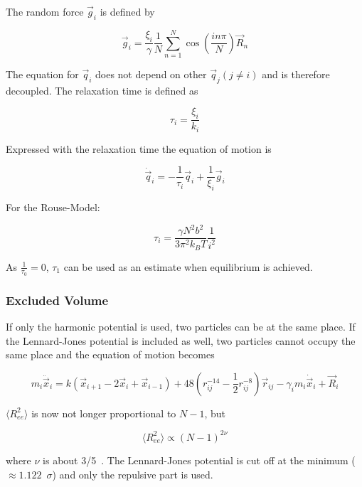 \documentclass[a4paper]{article}
\begin{document}
The random force $\vec{g}_i$ is defined by

\begin{equation}
\vec{g}_i = \frac{\xi_i}{\gamma} \frac{1}{N} \sum_{n=1}^N \cos \left( \frac{i n \pi}{N} \right) \vec{R}_n
\end{equation}

The equation for $\vec{q}_i$ does not depend on other $\vec{q}_j (j \neq i)$ and is therefore decoupled. The relaxation time is defined as

\begin{equation}
\tau_i = \frac{\xi_i}{k_i}
\end{equation}

Expressed with the relaxation time the equation of motion is

\begin{equation}
\dot{\vec{q}}_i = - \frac{1}{\tau_i} \vec{q}_i + \frac{1}{\xi_i} \vec{g}_i
\end{equation}

For the Rouse-Model:

\begin{equation}
\tau_i = \frac{\gamma N^2 b^2}{3 \pi^2 k_B T} \frac{1}{i^2}
\end{equation}

As $\frac{1}{\tau_0} = 0$, $\tau_1$ can be used as an estimate when equilibrium is achieved.

\subsubsection{Excluded Volume}

If only the harmonic potential is used, two particles can be at the same place. If the Lennard-Jones potential is included as well, two particles cannot occupy the same place and the equation of motion becomes

\begin{equation}
m_i \ddot{\vec{x}}_i = k (\vec{x}_{i+1} - 2 \vec{x}_i + \vec{x}_{i-1}) + 48 \left( r_{ij}^{-14} - \frac{1}{2} r_{ij}^{-8} \right) \vec{r}_{ij} - \gamma_i m_i \dot{\vec{x}}_i + \vec{R}_i
\end{equation}

$\langle R_{ee}^2 \rangle$ is now not longer proportional to $N-1$, but 

\begin{equation}
\langle R_{ee}^2 \rangle \propto (N-1)^{2 \nu}
\end{equation}

where $\nu$ is about 3/5~\cite{M.Doi1988}. The Lennard-Jones potential is cut off at the minimum ($\approx 1.122 \enspace \sigma$) and only the repulsive part is used.
\end{document}
